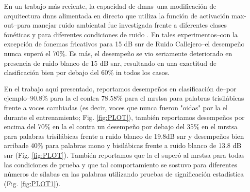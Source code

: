 {En un trabajo más reciente, la capacidad de \glspl{dmn}--una modificación de arquitectura \glspl{dnn} alimentada en directo que utiliza la función de activación max-out--para manejar ruido ambiental fue investigada frente a diferentes clases fonéticas y para diferentes condiciones de ruido \cite{silos_2016}. En tales experimentos--con la excepción de fonemas fricativos para 15 dB \gls{snr} de Ruido Callejero--el desempeño nunca superó el 70\%. Es más, el desempeño se vio seriamente deteriorado en presencia de ruido blanco de 15 dB \gls{snr}, resultando en una exactitud de clasificación bien por debajo del 60\% in todos los casos.

En el trabajo aquí presentado, reportamos desempeños en clasificación de--por ejemplo--90.8\% para la \gls{el} contra 78.58\% para el \gls{mrstsa} para palabras trisilábicas frente a voces cambiadas (es decir, voces que nunca fueron "oidas" por la \gls{el} durante el entrenamiento; Fig. \ref{fig:PLOT}), también reportamos desempeños por encima del 70\% en la \gls{el} contra un desempeño por debajo del 35\% en el \gls{mrstsa} para palabras trisilábicas frente a ruido blanco de 19.8dB \gls{snr} y desempeños bien arribade 40\% para palabras mono y bisilábicas frente a ruido blanco de 13.8 dB \gls{snr} (Fig. \ref{fig:PLOT}). También reportamos que la \gls{el} superó al \gls{mrstsa} para todas las condiciones de prueba y que tal comportamiento se sostuvo para diferentes números de sílabas en las palabras utilizando pruebas de significación estadística (Fig. \ref{fig:PLOT1}).

}
